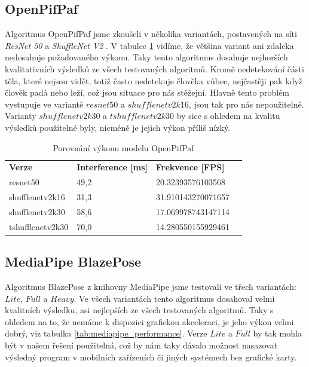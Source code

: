 \subsection{OpenPifPaf}

Algoritmus OpenPifPaf jsme zkoušeli v několika variantách, postavených na síti
\textit{ResNet 50} a \textit{ShuffleNet V2} \cite{shufflenetv2}. V tabulce
\ref{tab:openpifpaf_performance} vidíme, že většina variant ani zdaleka
nedosahuje požadovaného výkonu. Taky tento algoritmus dosahuje nejhorších
kvalitativních výsledků ze všech testovaných algoritmů. Kromě nedetekování
části těla, které nejsou vidět, totiž často nedetekuje člověka vůbec,
nejčastěji pak když člověk padá nebo leží, což jsou situace pro nás stěžejní.
Hlavně tento problém vystupuje ve variantě $resnet50$ a $shufflenetv2k16$, jsou
tak pro nás nepoužitelné. Varianty $shufflenetv2k30$ a $tshufflenetv2k30$ by
sice s ohledem na kvalitu výsledků použitelné byly, nicméně je jejich výkon
příliš nízký.

\begin{table}[htbp]
    \centering
    \caption{Porovnání výkonu modelu OpenPifPaf}
    \label{tab:openpifpaf_performance}
    \begin{tabular}{|l|l|l|l|}
        \hline
        \textbf{Verze}   & \textbf{Interference [ms]} & \textbf{Frekvence [FPS]} \\
        resnet50         & 49,2                       & 20.32393576103568        \\ \hline
        shufflenetv2k16  & 31,3                       & 31.910143270071657       \\ \hline
        shufflenetv2k30  & 58,6                       & 17.069978743147114       \\ \hline
        tshufflenetv2k30 & 70,0                       & 14.280550155929461       \\ \hline
    \end{tabular}
\end{table}

\subsection{MediaPipe BlazePose}

Algoritmus BlazePose z knihovny MediaPipe jsme testovali ve třech variantách:
$Lite$, $Full$ a $Heavy$. Ve všech variantách tento algoritmus dosahoval velmi
kvalitních výsledku, asi nejlepších ze všech testovaných algoritmů. Taky s
ohledem na to, že nemáme k dispozici grafickou akceleraci, je jeho výkon velmi
dobrý, viz tabulka \ref{tab:mediapipe_performance}. Verze $Lite$ a $Full$ by
tak mohla být v našem řešení použitelná, což by nám taky dávalo možnost
nasazovat výsledný program v mobilních zařízeních či jiných systémech bez
grafické karty.

